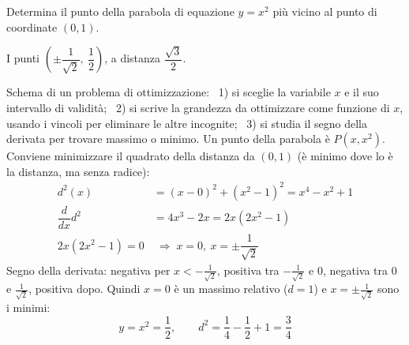 \begin{question}[ID=3.2, subtitle={Punto della parabola $y=x^2$ più vicino a $(0,1)$}, tags={ottimizzazione, geometria}, difficulty=media]
Determina il punto della parabola di equazione \(y = x^2\) più vicino al punto di coordinate \((0, 1)\).
\begin{solution}
I punti $\left(\pm\dfrac{1}{\sqrt2},\ \dfrac12\right)$, a distanza $\dfrac{\sqrt3}{2}$.
\end{solution}
\begin{explanation}
Schema di un problema di ottimizzazione: \ 1) si sceglie la variabile $x$ e il suo intervallo di validità; \ 2) si scrive la grandezza da ottimizzare come funzione di $x$, usando i vincoli per eliminare le altre incognite; \ 3) si studia il segno della derivata per trovare massimo o minimo.
Un punto della parabola è $P(x,x^2)$. Conviene minimizzare il quadrato della distanza da $(0,1)$ (è minimo dove lo è la distanza, ma senza radice):
\[\begin{aligned}
d^2(x) &= (x-0)^2+(x^2-1)^2=x^4-x^2+1\\
\dfrac{d}{dx}d^2 &= 4x^3-2x=2x(2x^2-1)\\
2x(2x^2-1)=0 &\;\Rightarrow\; x=0,\ x=\pm\dfrac{1}{\sqrt2}
\end{aligned}\]
Segno della derivata: negativa per $x<-\tfrac1{\sqrt2}$, positiva tra $-\tfrac1{\sqrt2}$ e $0$, negativa tra $0$ e $\tfrac1{\sqrt2}$, positiva dopo. Quindi $x=0$ è un massimo relativo ($d=1$) e $x=\pm\tfrac1{\sqrt2}$ sono i minimi:
\[ y=x^2=\dfrac12, \qquad d^2=\dfrac14-\dfrac12+1=\dfrac34 \]
\end{explanation}
\end{question}


